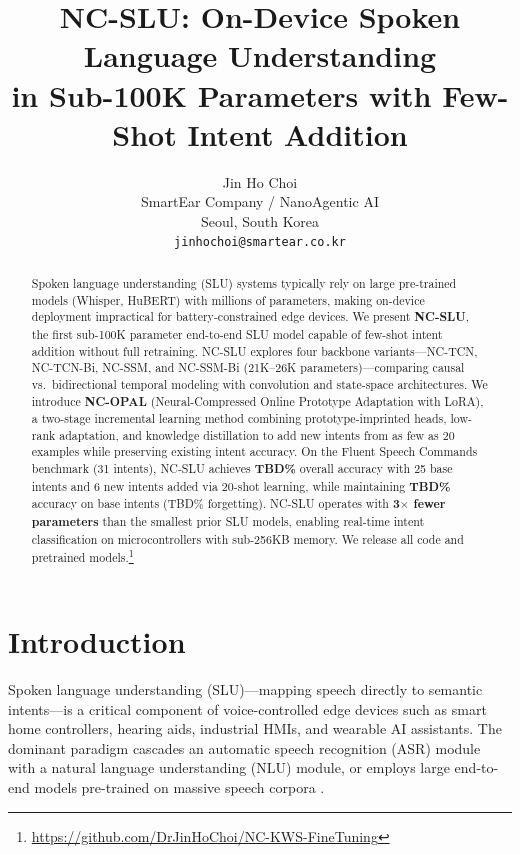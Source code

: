 \documentclass[11pt]{article}
\title{NC-SLU: On-Device Spoken Language Understanding \\ in Sub-100K Parameters with Few-Shot Intent Addition}
\author{Jin Ho Choi \\
  SmartEar Company / NanoAgentic AI \\
  Seoul, South Korea \\
  \texttt{jinhochoi@smartear.co.kr}}
\begin{document}
\maketitle

\begin{abstract}
Spoken language understanding (SLU) systems typically rely on large pre-trained models (Whisper, HuBERT) with millions of parameters, making on-device deployment impractical for battery-constrained edge devices.
We present \textbf{NC-SLU}, the first sub-100K parameter end-to-end SLU model capable of few-shot intent addition without full retraining.
NC-SLU explores four backbone variants---NC-TCN, NC-TCN-Bi, NC-SSM, and NC-SSM-Bi (21K--26K parameters)---comparing causal vs.\ bidirectional temporal modeling with convolution and state-space architectures.
We introduce \textbf{NC-OPAL} (Neural-Compressed Online Prototype Adaptation with LoRA), a two-stage incremental learning method combining prototype-imprinted heads, low-rank adaptation, and knowledge distillation to add new intents from as few as 20 examples while preserving existing intent accuracy.
On the Fluent Speech Commands benchmark (31 intents), NC-SLU achieves \textbf{TBD\%} overall accuracy with 25 base intents and 6 new intents added via 20-shot learning, while maintaining \textbf{TBD\%} accuracy on base intents (TBD\% forgetting).
NC-SLU operates with \textbf{3$\times$ fewer parameters} than the smallest prior SLU models, enabling real-time intent classification on microcontrollers with sub-256KB memory.
We release all code and pretrained models.\footnote{\url{https://github.com/DrJinHoChoi/NC-KWS-FineTuning}}
\end{abstract}

\section{Introduction}

Spoken language understanding (SLU)---mapping speech directly to semantic intents---is a critical component of voice-controlled edge devices such as smart home controllers, hearing aids, industrial HMIs, and wearable AI assistants.
The dominant paradigm cascades an automatic speech recognition (ASR) module with a natural language understanding (NLU) module, or employs large end-to-end models pre-trained on massive speech corpora \cite{lugosch2019speech,arora2023espnetslu,radford2023whisper}.
\end{document}
